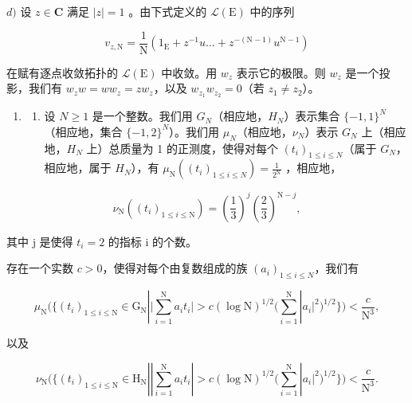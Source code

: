 \(d)\) 设 \(z \in \mathbf{C}\) 满足 \(|z| = 1\) 。由下式定义的 \(\mathcal{L}(\mathrm{E})\) 中的序列

\[
v _ {z, \mathrm{N}} = \frac {1}{\mathrm{N}} (1 _ {\mathrm{E}} + z ^ {- 1} u \dots + z ^ {- (\mathrm{N-1})} u ^ {\mathrm{N-1}})
\]

在赋有逐点收敛拓扑的 \(\mathcal{L}(\mathrm{E})\) 中收敛。用 \(w_{z}\) 表示它的极限。则 \(w_{z}\) 是一个投影，我们有 \(w_{z}w = ww_{z} = zw_{z}\)，以及 \(w_{z_1}w_{z_2} = 0\)（若 \(z_{1} \neq z_{2}\)）。

\begin{enumerate}
\def\labelenumi{\arabic{enumi})}
\setcounter{enumi}{24}
\tightlist
\item
  \begin{enumerate}
  \def\labelenumii{\alph{enumii})}
  \tightlist
  \item
    设 \(N \geqslant 1\) 是一个整数。我们用 \(G_{N}\)（相应地，\(H_{N}\)）表示集合 \(\{-1,1\}^{N}\)（相应地，集合 \(\{-1,2\}^{N}\)）。我们用 \(\mu_{N}\)（相应地，\(\nu_{N}\)）表示 \(G_{N}\) 上（相应地，\(H_{N}\) 上）总质量为 1 的正测度，使得对每个 \((t_{i})_{1 \leqslant i \leqslant N}\)（属于 \(G_{N}\)，相应地，属于 \(H_{N}\)），有 \(\mu_{\mathrm{N}}((t_{i})_{1 \leqslant i \leqslant N}) = \frac{1}{2^{\mathrm{N}}}\) ，相应地，
  \end{enumerate}
\end{enumerate}

\[
\nu_ {\mathrm{N}} ((t _ {i}) _ {1 \leqslant i \leqslant \mathrm{N}}) = \left(\frac {1}{3}\right) ^ {j} \left(\frac {2}{3}\right) ^ {\mathrm{N} - j},
\]

其中 j 是使得 \(t_{i}=2\) 的指标 i 的个数。

存在一个实数 \(c > 0\)，使得对每个由复数组成的族 \((a_{i})_{1\leqslant i\leqslant N}\)，我们有

\[
\mu_ {\mathrm{N}} \Big (\Big \{(t _ {i}) _ {1 \leqslant i \leqslant \mathrm{N}} \in \mathrm{G} _ {\mathrm{N}} | \Big | \sum_ {i = 1} ^ {\mathrm{N}} a _ {i} t _ {i} \Big | > c (\log \mathrm{N}) ^ {1 / 2} \Big (\sum_ {i = 1} ^ {\mathrm{N}} | a _ {i} | ^ {2} \Big) ^ {1 / 2} \Big \} \Big) <   \frac {c}{\mathrm{N} ^ {3}},
\]

以及

\[
\nu_ {\mathrm{N}} \Big (\Big \{(t _ {i}) _ {1 \leqslant i \leqslant \mathrm{N}} \in \mathrm{H} _ {\mathrm{N}} | \left| \sum_ {i = 1} ^ {\mathrm{N}} a _ {i} t _ {i} \right| > c (\log \mathrm{N}) ^ {1 / 2} \Big (\sum_ {i = 1} ^ {\mathrm{N}} | a _ {i} | ^ {2} \Big) ^ {1 / 2} \Big \} \Big) <   \frac {c}{\mathrm{N} ^ {3}}.
\]

